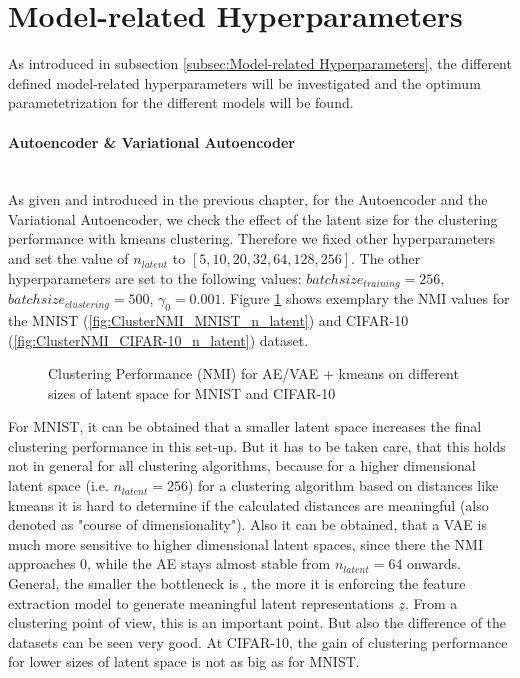 \documentclass[12pt,DIV14,BCOR12mm,a4paper,footexclude,headinclude,halfparskip-,twoside,openright,openany,cleardoubleempty,idxtotoc,bibtotoc]{scrreprt} %
\numberwithin{equation}{chapter}
\begin{document}
\section{Model-related Hyperparameters}
As introduced in subsection \ref{subsec:Model-related Hyperparameters}, the different defined model-related hyperparameters will be investigated and the optimum parametetrization for the different models will be found. 
\paragraph{Autoencoder \& Variational Autoencoder}\hfill \\
As given and introduced in the previous chapter, for the Autoencoder and the Variational Autoencoder, we check the effect of the latent size for the clustering performance with kmeans clustering. Therefore we fixed other hyperparameters and set the value of $n_{latent}$ to $[5, 10, 20, 32, 64, 128, 256]$. The other hyperparameters are set to the following values: $batchsize_{training} = 256$, $batchsize_{clustering} = 500$, $\gamma_0 = 0.001$. Figure \ref{fig:ClusterPerformance_latentSpace} shows exemplary the NMI values for the MNIST (\ref{fig:ClusterNMI_MNIST_n_latent}) and CIFAR-10 (\ref{fig:ClusterNMI_CIFAR-10_n_latent}) dataset.
	\begin{figure}[htb!]
		\centering
		\qquad
		\caption{Clustering Performance (NMI) for AE/VAE + kmeans on different sizes of latent space for MNIST and CIFAR-10}
		\label{fig:ClusterPerformance_latentSpace}
	\end{figure}
For MNIST, it can be obtained that a smaller latent space increases the final clustering performance in this set-up. But it has to be taken care, that this holds not in general for all clustering algorithms, because for a higher dimensional latent space (i.e. $n_{latent} = 256$) for a clustering algorithm based on distances like kmeans it is hard to determine if the calculated distances are meaningful (also denoted as "course of dimensionality"). Also it can be obtained, that a VAE is much more sensitive to higher dimensional latent spaces, since there the NMI approaches $0$, while the AE stays almost stable from $n_{latent} = 64$ onwards. General, the smaller the bottleneck is , the more it is enforcing the feature extraction model to generate meaningful latent representations $\underline{z}$. From a clustering point of view, this is an important point. But also the difference of the datasets can be seen very good. At CIFAR-10, the gain of clustering performance for lower sizes of latent space is not as big as for MNIST. 
\end{document}
